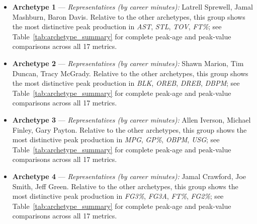 \begin{itemize}
\item \textbf{Archetype 1} --- \emph{Representatives (by career minutes):} Latrell Sprewell, Jamal Mashburn, Baron Davis. Relative to the other archetypes, this group shows the most distinctive peak production in \textit{AST}, \textit{STL}, \textit{TOV}, \textit{FT\%}; see Table~\ref{tab:archetype_summary} for complete peak-age and peak-value comparisons across all 17 metrics.
\item \textbf{Archetype 2} --- \emph{Representatives (by career minutes):} Shawn Marion, Tim Duncan, Tracy McGrady. Relative to the other archetypes, this group shows the most distinctive peak production in \textit{BLK}, \textit{OREB}, \textit{DREB}, \textit{DBPM}; see Table~\ref{tab:archetype_summary} for complete peak-age and peak-value comparisons across all 17 metrics.
\item \textbf{Archetype 3} --- \emph{Representatives (by career minutes):} Allen Iverson, Michael Finley, Gary Payton. Relative to the other archetypes, this group shows the most distinctive peak production in \textit{MPG}, \textit{GP\%}, \textit{OBPM}, \textit{USG}; see Table~\ref{tab:archetype_summary} for complete peak-age and peak-value comparisons across all 17 metrics.
\item \textbf{Archetype 4} --- \emph{Representatives (by career minutes):} Jamal Crawford, Joe Smith, Jeff Green. Relative to the other archetypes, this group shows the most distinctive peak production in \textit{FG3\%}, \textit{FG3A}, \textit{FT\%}, \textit{FG2\%}; see Table~\ref{tab:archetype_summary} for complete peak-age and peak-value comparisons across all 17 metrics.
\end{itemize}
